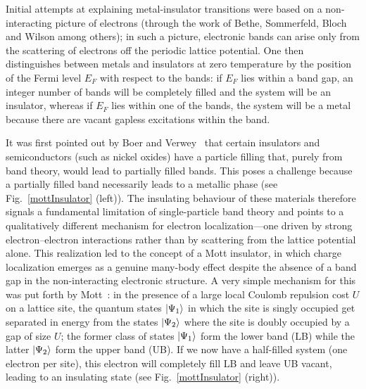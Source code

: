 Initial attempts at explaining metal-insulator transitions were based on a non-interacting picture of electrons (through the work of Bethe, Sommerfeld, Bloch and Wilson among others); in such a picture, electronic bands can arise only from the scattering of electrons off the periodic lattice potential. One then distinguishes between metals and insulators at zero temperature by the position of the Fermi level \(E_F\) with respect to the bands: if \(E_F\) lies within a band gap, an integer number of bands will be completely filled and the system will be an insulator, whereas if \(E_F\) lies within one of the bands, the system will be a metal because there are vacant gapless excitations within the band. 

It was first pointed out by Boer and Verwey~\cite{Boer_1937} that certain insulators and semiconductors (such as nickel oxides) have a particle filling that, purely from band theory, would lead to partially filled bands. This poses a challenge because a partially filled band necessarily leads to a metallic phase (see Fig.~\ref{mottInsulator} (left)). The insulating behaviour of these materials therefore signals a fundamental limitation of single-particle band theory and points to a qualitatively different mechanism for electron localization---one driven by strong electron–electron interactions rather than by scattering from the lattice potential alone. This realization led to the concept of a Mott insulator, in which charge localization emerges as a genuine many-body effect despite the absence of a band gap in the non-interacting electronic structure. A very simple mechanism for this was put forth by Mott~\cite{Mott_1949,Mott1956,Mott961}: in the presence of a large local Coulomb repulsion cost \(U\) on a lattice site, the quantum states \(\ket{\Psi_1}\) in which the site is singly occupied get separated in energy from the states \(\ket{\Psi_2}\) where the site is doubly occupied by a gap of size \(U\); the former class of states \(\ket{\Psi_1}\) form the lower band (LB) while the latter \(\ket{\Psi_2}\) form the upper band (UB). If we now have a half-filled system (one electron per site), this electron will completely fill LB and leave UB vacant, leading to an insulating state (see Fig.~\ref{mottInsulator} (right)).


